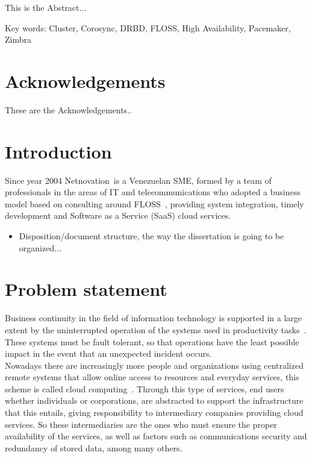 \documentclass[a4paper, 12pt]{book}
\begin{document}
This is the Abstract...

\noindent
Key words: Cluster, Corosync, DRBD, FLOSS, High Availability, Pacemaker, Zimbra

%
\chapter*{Acknowledgements}
\label{chap:acknowledgements}

These are the Acknowledgements..

%
\tableofcontents  	%
\listoffigures  	%
\listoftables 		%

%
\chapter{Introduction}
\label{chap:introduction}

Since year 2004 Netnovation\texttrademark \ is a Venezuelan SME, formed by a team of professionals in the areas of IT and telecommunications who adopted a business model based on consulting around FLOSS~\cite{Daffara2}, providing system integration, timely development and Software as a Service (SaaS) cloud services.

\begin{itemize}
	\item Disposition/document structure, the way the dissertation is going to be organized...
\end{itemize}



%
\chapter{Problem statement}
\label{chap:problem}

Business continuity in the field of information technology is supported in a large extent by the uninterrupted operation of the systems used in productivity tasks~\cite{ISO}. These systems must be fault tolerant, so that operations have the least possible impact in the event that an unexpected incident occurs.\\

\noindent Nowadays there are increasingly more people and organizations using centralized remote systems that allow online access to resources and everyday services, this scheme is called cloud computing~\cite{Mell & Grance}. Through this type of services, end users whether individuals or corporations, are abstracted to support the infrastructure that this entails, giving responsibility to intermediary companies providing cloud services. So these intermediaries are the ones who must ensure the proper availability of the services, as well as factors such as communications security and redundancy of stored data, among many others.\\
\end{document}
